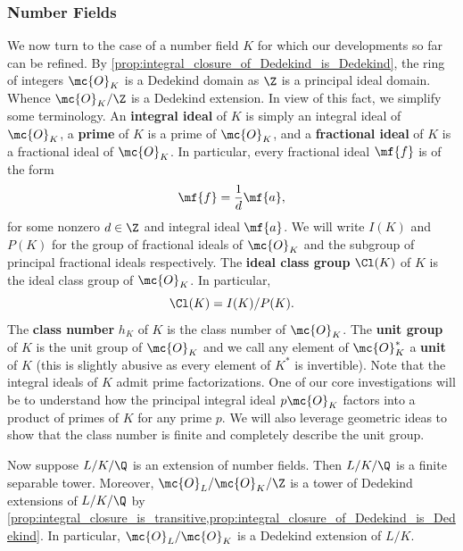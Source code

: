 \documentclass[12pt]{article}
\begin{document}
      \subsubsection*{Number Fields}
        We now turn to the case of a number field \(K\) for which our developments so far can be refined. By \cref{prop:integral_closure_of_Dedekind_is_Dedekind}, the ring of integers \(\mc{O}_{K}\) is a Dedekind domain as \(\Z\) is a principal ideal domain. Whence \(\mc{O}_{K}/\Z\) is a Dedekind extension. In view of this fact, we simplify some terminology. An \textbf{integral ideal} of \(K\) is simply an integral ideal of \(\mc{O}_{K}\), a \textbf{prime} of \(K\) is a prime of \(\mc{O}_{K}\), and a \textbf{fractional ideal} of \(K\) is a fractional ideal of \(\mc{O}_{K}\). In particular, every fractional ideal \(\mf{f}\) is of the form
        \[
          \mf{f} = \frac{1}{d}\mf{a},
        \]
        for some nonzero \(d \in \Z\) and integral ideal \(\mf{a}\). We will write \(I(K)\) and \(P(K)\) for the group of fractional ideals of \(\mc{O}_{K}\) and the subgroup of principal fractional ideals respectively. The \textbf{ideal class group} \(\Cl(K)\) of \(K\) is the ideal class group of \(\mc{O}_{K}\). In particular,
        \[
          \Cl(K) = I(K)/P(K).
        \]
        The \textbf{class number} \(h_{K}\) of \(K\) is the class number of \(\mc{O}_{K}\). The \textbf{unit group} of \(K\) is the unit group of \(\mc{O}_{K}\) and we call any element of \(\mc{O}_{K}^{\ast}\) a \textbf{unit} of \(K\) (this is slightly abusive as every element of \(K^{\ast}\) is invertible). Note that the integral ideals of \(K\) admit prime factorizations. One of our core investigations will be to understand how the principal integral ideal \(p\mc{O}_{K}\) factors into a product of primes of \(K\) for any prime \(p\). We will also leverage geometric ideas to show that the class number is finite and completely describe the unit group.

        Now suppose \(L/K/\Q\) is an extension of number fields. Then \(L/K/\Q\) is a finite separable tower. Moreover, \(\mc{O}_{L}/\mc{O}_{K}/\Z\) is a tower of Dedekind extensions of \(L/K/\Q\) by \cref{prop:integral_closure_is_transitive,prop:integral_closure_of_Dedekind_is_Dedekind}. In particular, \(\mc{O}_{L}/\mc{O}_{K}\) is a Dedekind extension of \(L/K\).
\end{document}
